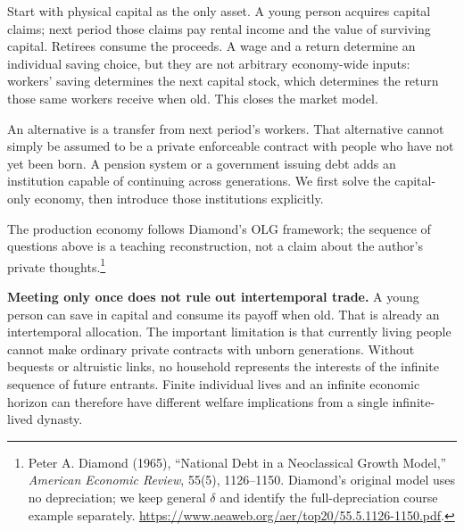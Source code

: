 Start with physical capital as the only asset. A young person acquires capital
claims; next period those claims pay rental income and the value of surviving
capital. Retirees consume the proceeds. A wage and a return determine an
individual saving choice, but they are not arbitrary economy-wide inputs:
workers' saving determines the next capital stock, which determines the return
those same workers receive when old. This closes the market model.

An alternative is a transfer from next period's workers. That alternative
cannot simply be assumed to be a private enforceable contract with people who
have not yet been born. A pension system or a government issuing debt adds an
institution capable of continuing across generations. We first solve the
capital-only economy, then introduce those institutions explicitly.

The production economy follows Diamond's OLG framework; the sequence of
questions above is a teaching reconstruction, not a claim about the author's
private thoughts.\footnote{Peter A. Diamond (1965), ``National Debt in a
Neoclassical Growth Model,'' \textit{American Economic Review}, 55(5),
1126--1150. Diamond's original model uses no depreciation; we keep general
$\delta$ and identify the full-depreciation course example separately.
\url{https://www.aeaweb.org/aer/top20/55.5.1126-1150.pdf}.}

\begin{blueblock}
\textbf{Meeting only once does not rule out intertemporal trade.}
A young person can save in capital and consume its payoff when old. That is
already an intertemporal allocation. The important limitation is that currently
living people cannot make ordinary private contracts with unborn generations.
Without bequests or altruistic links, no household represents the interests
of the infinite sequence of future entrants. Finite individual lives and an
infinite economic horizon can therefore have different welfare implications
from a single infinite-lived dynasty.
\end{blueblock}



